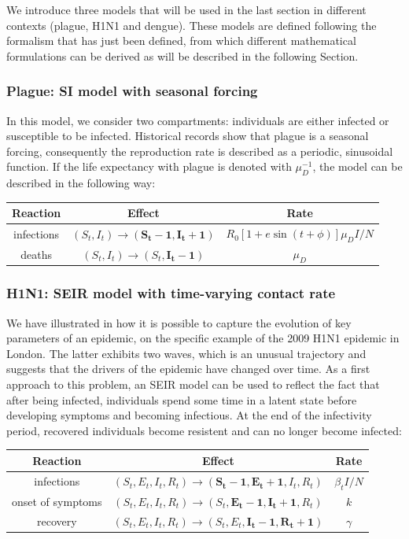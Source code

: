 \documentclass[a4paper,11pt,titlepage]{article}
\theoremstyle{plain} %
\begin{document}
We introduce three models that will be used in the last section in different contexts (plague, H1N1 and dengue). These models are defined following the formalism that has just been defined, from which different mathematical formulations can be derived as will be described in the following Section.

\subsubsection{\label{sec:plague}Plague: SI model with seasonal forcing}

In this model, we consider two compartments: individuals are either infected or susceptible to be infected. Historical records show that plague is a seasonal forcing, consequently the reproduction rate is described as a periodic, sinusoidal function. If the life expectancy with plague is denoted with $\mu_D^{-1}$, the model can be described in the following way:

\begin{center}
\begin{tabular}{ccc}
\textbf{Reaction} & \textbf{Effect}   & \textbf{Rate}   \tabularnewline
\hline
infections  & $(S_t,I_t)\rightarrow (\boldsymbol{S_t-1},\boldsymbol{I_t+1})$ & $R_0[1+e\sin(t+\phi)]\mu_DI/N$  \tabularnewline
deaths       & $(S_t,I_t)\rightarrow (S_t,\boldsymbol{I_t-1})$ & $\mu_D$  \tabularnewline
\end{tabular}
\end{center}

\subsubsection{H1N1: SEIR model with time-varying contact rate}

We have illustrated in \cite{Dureau2013a} how it is possible to capture the evolution of key parameters of an epidemic, on the specific example of the 2009 H1N1 epidemic in London. The latter exhibits two waves, which is an unusual trajectory and suggests that the drivers of the epidemic have changed over time. As a first approach to this problem, an SEIR model can be used to reflect the fact that after being infected, individuals spend some time in a latent state before developing symptoms and becoming infectious. At the end of the infectivity period, recovered individuals become resistent and can no longer become infected:


\begin{center}
\begin{tabular}{ccc}
\textbf{Reaction} & \textbf{Effect}   & \textbf{Rate}   \tabularnewline
\hline
infections  & $(S_t,E_t,I_t,R_t)\rightarrow (\boldsymbol{S_t-1},\boldsymbol{E_t+1},I_t,R_t)$ & $\beta_t I/N$  \tabularnewline
onset of symptoms       & $(S_t,E_t,I_t,R_t)\rightarrow (S_t,\boldsymbol{E_t-1},\boldsymbol{I_t+1},R_t)$ & $k$  \tabularnewline
recovery       & $(S_t,E_t,I_t,R_t)\rightarrow (S_t,E_t,\boldsymbol{I_t-1},\boldsymbol{R_t+1})$ & $\gamma$  \tabularnewline
\end{tabular}
\end{center}
\end{document}

